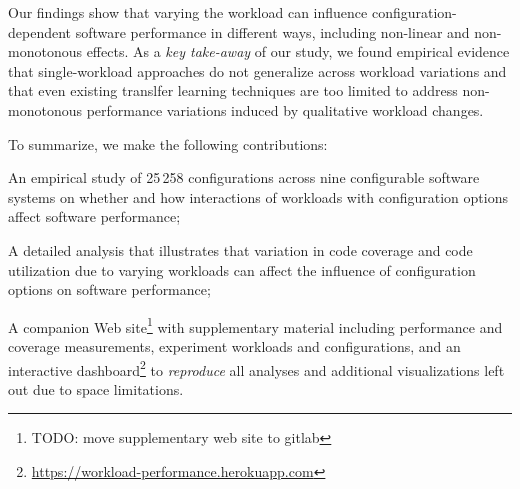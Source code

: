 {\color{edited}Our findings show that varying the workload can influence con\-fi\-gu\-ra\-tion-de\-pen\-dent software performance in different ways, including non-linear and non-monotonous effects. 
As a \textit{key take-away} of our study, we found empirical evidence that single-workload approaches do not generalize across workload variations and that even existing translfer learning techniques are too limited to address non-monotonous performance variations induced by qualitative workload changes. 
}

To summarize, we make the following contributions: 
\begin{compactitem}
	\item An empirical study of 25\,258 configurations across nine configurable software systems on whether and how interactions of workloads with configuration options affect software  performance;
	
	\item A detailed analysis that illustrates that variation in code coverage and code utilization due to varying workloads can affect the influence of configuration options on software performance; 
	
	\item A companion Web site\footnote{\color{red}TODO: move supplementary web site to gitlab} with supplementary material including performance and coverage measurements, experiment workloads and configurations, and an interactive dashboard\footnote{\url{https://workload-performance.herokuapp.com}} to \textit{reproduce} all analyses and additional visualizations left out due to space limitations.
	
\end{compactitem}


